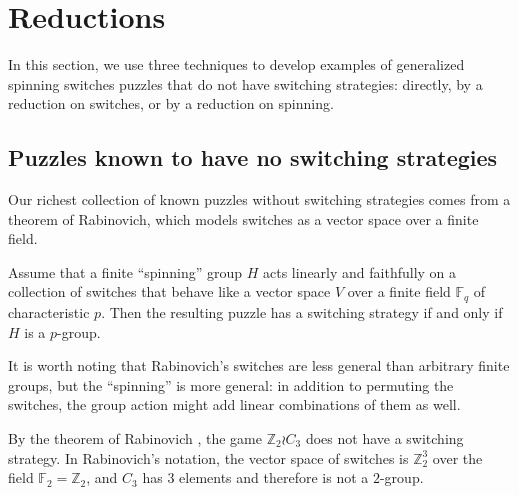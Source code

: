 


\section{Reductions}
\label{sec:Reductions}
In this section, we use three techniques to develop examples of generalized
spinning switches puzzles
that do not have switching strategies:
directly, by a reduction on switches, or by a reduction on spinning.
%
\subsection{Puzzles known to have no switching strategies}
Our richest collection of known puzzles without switching strategies comes from
a theorem of Rabinovich, which models switches as a vector space over
a finite field.
\begin{theorem} \cite{Rabinovich2022}
  Assume that a finite ``spinning'' group $H$ acts linearly and faithfully on
  a collection of switches that behave like a vector space
  $V$ over a finite field $\mathbb F_q$ of characteristic $p$.
  Then the resulting puzzle has a switching strategy if and only if $H$ is a
  $p$-group.
  \label{thm:Rabinovich}
\end{theorem}
It is worth noting that Rabinovich's switches are less general than arbitrary
finite groups, but the ``spinning'' is more general: in addition to permuting
the switches, the group action might add linear combinations of them as well.
\begin{example}
  By the theorem of Rabinovich \cite{Rabinovich2022},
  the game $\mathbb Z_2 \wr C_3$ does not have a
  switching strategy. In Rabinovich's notation, the vector space of switches
  is $\mathbb Z_2^3$ over the field $\mathbb F_2 = \mathbb Z_2$, and
  $C_3$ has $3$ elements and therefore is not a $2$-group.
  \label{ex:NoSolutionZ2C3}
\end{example}

